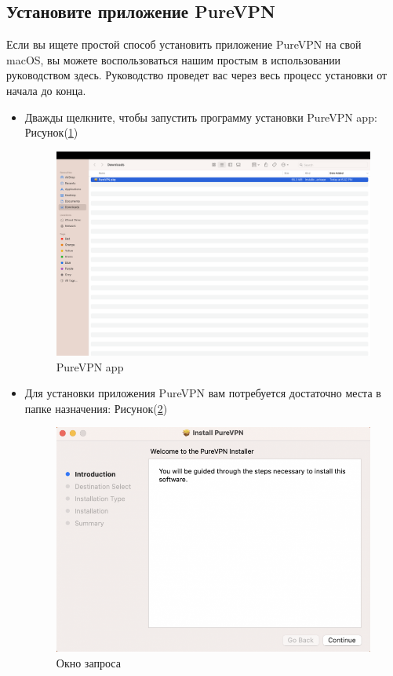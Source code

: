 \subsection{Установите приложение PureVPN} 
Если вы ищете простой способ установить приложение PureVPN на свой macOS, вы можете воспользоваться нашим простым в использовании руководством здесь. Руководство проведет вас через весь процесс установки от начала до конца.
\begin{itemize}
\item Дважды щелкните, чтобы запустить программу установки PureVPN app:  Рисунок(\ref{fig:26})
\begin{figure}[H]
\includegraphics[width=14cm]{21.png}
\centering
\caption{ PureVPN app}
\label{fig:26}
\end{figure}
\item Для установки приложения PureVPN вам потребуется достаточно места в папке назначения:  Рисунок(\ref{fig:27})
\begin{figure}[H]
\includegraphics[width=14cm]{22.png}
\centering
\caption{Окно запроса}
\label{fig:27}
\end{figure}


\end{itemize}
